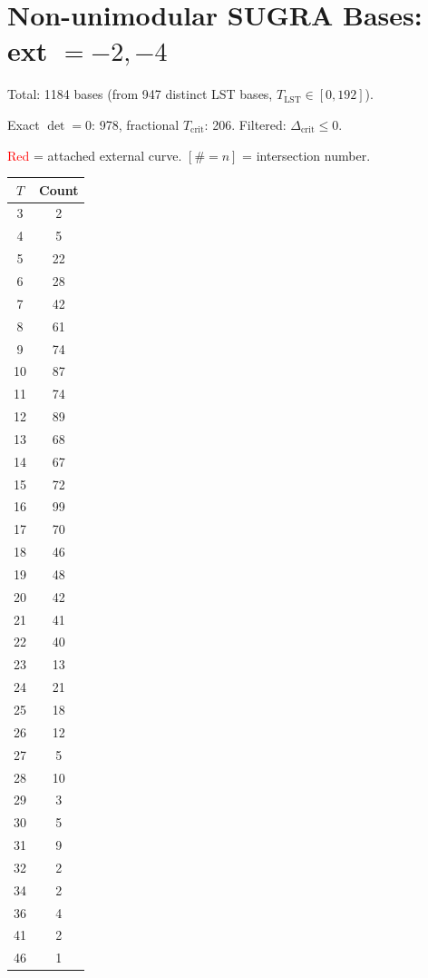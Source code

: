 \documentclass[10pt]{article}
\begin{document}
\section*{Non-unimodular SUGRA Bases: ext $= -2, -4$}

Total: 1184 bases (from 947 distinct LST bases, $T_{\text{LST}} \in [0, 192]$).

Exact $\det=0$: 978, fractional $T_{\text{crit}}$: 206. Filtered: $\Delta_{\text{crit}} \leq 0$.

\textcolor{red}{Red} = attached external curve. $\scriptstyle [\#=n]$ = intersection number.

\begin{center}
\begin{tabular}{c|c}
\toprule
$T$ & Count \\
\midrule
3 & 2 \\
4 & 5 \\
5 & 22 \\
6 & 28 \\
7 & 42 \\
8 & 61 \\
9 & 74 \\
10 & 87 \\
11 & 74 \\
12 & 89 \\
13 & 68 \\
14 & 67 \\
15 & 72 \\
16 & 99 \\
17 & 70 \\
18 & 46 \\
19 & 48 \\
20 & 42 \\
21 & 41 \\
22 & 40 \\
23 & 13 \\
24 & 21 \\
25 & 18 \\
26 & 12 \\
27 & 5 \\
28 & 10 \\
29 & 3 \\
30 & 5 \\
31 & 9 \\
32 & 2 \\
34 & 2 \\
36 & 4 \\
41 & 2 \\
46 & 1 \\
\bottomrule
\end{tabular}

\end{center}
\end{document}
